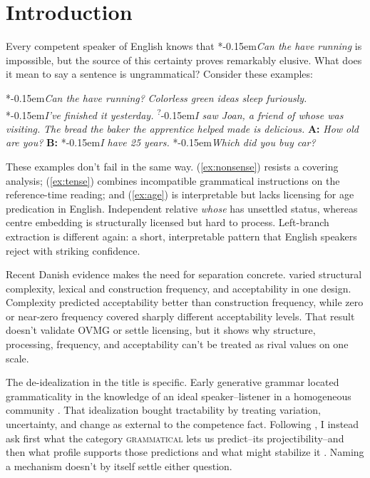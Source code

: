 \documentclass[12pt,letterpaper]{article}
\newcommand{\term}[1]{\textsc{#1}}
\newcommand{\mention}[1]{\textit{#1}}
\newcommand{\judgesep}{\kern-0.15em}
\newcommand{\ungram}[1]{*\judgesep#1}
\newcommand{\marg}[1]{\textsuperscript{?}\judgesep#1}
\begin{document}
\section{Introduction}

Every competent speaker of English knows that \ungram{\mention{Can the have running}} is impossible, but the source of this certainty proves remarkably elusive. What does it mean to say a sentence is ungrammatical? Consider these examples:

\ea \label{ex:starting-stars}
\ea\label{ex:nonsense} \ungram{\mention{Can the have running?}}
\ex\label{ex:colorless-grammatica} \mention{Colorless green ideas sleep furiously.} \autocite{chomsky1957}
\ex\label{ex:tense} \ungram{\mention{I've finished it yesterday.}}
\ex\marg{\mention{I saw Joan, a friend of whose was visiting.}}\label{ex:whose}
\ex\label{ex:center} \mention{The bread the baker the apprentice helped made is delicious.}
\ex\label{ex:age} \textbf{A:} \mention{How old are you?} \textbf{B:} \ungram{\mention{I have 25 years.}}
\ex\label{ex:lbe} \ungram{\mention{Which did you buy car?}}
\z\z

These examples don't fail in the same way. (\ref{ex:nonsense}) resists a
covering analysis; (\ref{ex:tense}) combines incompatible grammatical
instructions on the reference-time reading; and (\ref{ex:age}) is interpretable but lacks licensing for age
predication in English. Independent relative \mention{whose} has unsettled
status, whereas centre embedding is structurally licensed but hard to process.
Left-branch extraction is different again: a short, interpretable pattern that
English speakers reject with striking confidence.

Recent Danish evidence makes the need for separation concrete.
\textcite{christensen2024complexity} varied structural complexity, lexical and
construction frequency, and acceptability in one design. Complexity predicted
acceptability better than construction frequency, while zero or near-zero
frequency covered sharply different acceptability levels. That result doesn't
validate OVMG or settle licensing, but it shows why structure, processing,
frequency, and acceptability can't be treated as rival values on one scale.

The de-idealization in the title is specific. Early generative grammar located
grammaticality in the knowledge of an ideal speaker--listener in a homogeneous
community \autocite[3]{chomsky1965}. That idealization bought tractability by
treating variation, uncertainty, and change as external to the competence fact.
Following \textcite{Goodman1955}, I instead ask first what the category
\term{grammatical} lets us predict--its projectibility--and then what profile
supports those predictions and what might stabilize it
\autocite{boyd1999,millikan1999,khalidi2013,khalidi2018nodes,slater2015,
reynolds2026kindsProjectibilityProfiles}. Naming a mechanism doesn't by itself
settle either question.
\end{document}
